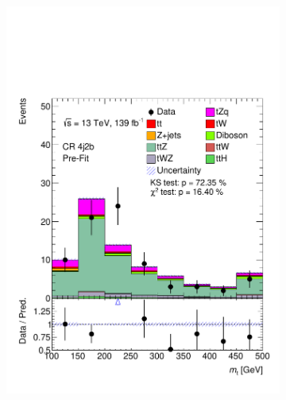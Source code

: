 \begin{figure}[!h]
\begin{subfigure}[b]{0.32\linewidth}
    \includegraphics[width=\linewidth]{ubonn-thesis/Chapters/Chapters_06/Figure/Input_distribution/CR_4j2b_Top_mass.pdf} 
  \end{subfigure} 
  \begin{subfigure}[b]{0.32\linewidth}
    \centering

\end{subfigure}
\end{figure}
